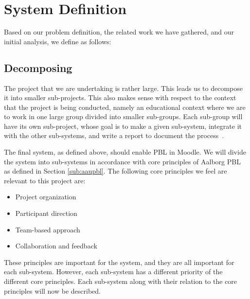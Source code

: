 \chapter{System Definition}
\label{sec:systemDef}
Based on our problem definition, the related work we have gathered, and our initial analysis, we define \system{} as follows:


\section{Decomposing \system}
\label{sub:decomposingSys}
The project that we are undertaking is rather large.
This leads us to decompose it into smaller sub-projects.
This also makes sense with respect to the context that the project is being conducted, namely an educational context where we are to work in one large group divided into smaller sub-groups. 
Each sub-group will have its own sub-project, whose goal is to make a given sub-system, integrate it with the other sub-systems, and write a report to document the process~\cite{sw6studieordning}.

The final system, as defined above, should enable PBL in Moodle.
We will divide the system into sub-systems in accordance with core principles of Aalborg PBL as defined in Section \ref{sub:aaupbl}.
The following core principles we feel are relevant to this project are:

\begin{itemize}
	\item Project organization
  \item Participant direction
  \item Team-based approach
  \item Collaboration and feedback
\end{itemize}

These principles are important for the system, and they are all important for each sub-system.
However, each sub-system has a different priority of the different core principles.
Each sub-system along with their relation to the core principles will now be described.


